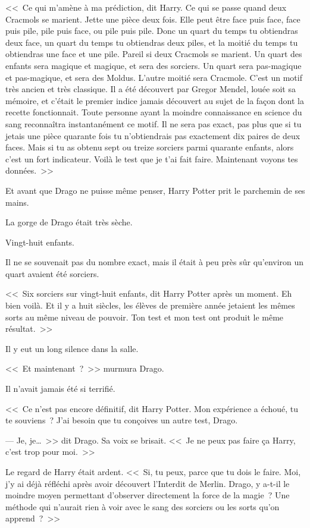 <<~Ce qui m'amène à ma prédiction, dit Harry. Ce qui se passe quand deux Cracmols se marient. Jette une pièce deux fois. Elle peut être face puis face, face puis pile, pile puis face, ou pile puis pile. Donc un quart du temps tu obtiendras deux face, un quart du temps tu obtiendras deux piles, et la moitié du temps tu obtiendras une face et une pile. Pareil si deux Cracmols se marient. Un quart des enfants sera magique et magique, et sera des sorciers. Un quart sera pas-magique et pas-magique, et sera des Moldus. L'autre moitié sera Cracmole. C'est un motif très ancien et très classique. Il a été découvert par Gregor Mendel, louée soit sa mémoire, et c'était le premier indice jamais découvert au sujet de la façon dont la recette fonctionnait. Toute personne ayant la moindre connaissance en science du sang reconnaîtra instantanément ce motif. Il ne sera pas exact, pas plus que si tu jetais une pièce quarante fois tu n'obtiendrais pas exactement dix paires de deux faces. Mais si tu as obtenu sept ou treize sorciers parmi quarante enfants, alors c'est un fort indicateur. Voilà le test que je t'ai fait faire. Maintenant voyons tes données.~>>

Et avant que Drago ne puisse même penser, Harry Potter prit le parchemin de ses mains.

La gorge de Drago était très sèche.

Vingt-huit enfants.

Il ne se souvenait pas du nombre exact, mais il était à peu près sûr qu'environ un quart avaient été sorciers.

<<~Six sorciers sur vingt-huit enfants, dit Harry Potter après un moment. Eh bien voilà. Et il y a huit siècles, les élèves de première année jetaient les mêmes sorts au même niveau de pouvoir. Ton test et mon test ont produit le même résultat.~>>

Il y eut un long silence dans la salle.

<<~Et maintenant~?~>> murmura Drago.

Il n'avait jamais été si terrifié.

<<~Ce n'est pas encore définitif, dit Harry Potter. Mon expérience a échoué, tu te souviens~? J'ai besoin que tu conçoives un autre test, Drago.

--- Je, je…~>> dit Drago. Sa voix se brisait. <<~Je ne peux pas faire ça Harry, c'est trop pour moi.~>>

Le regard de Harry était ardent. <<~Si, tu peux, parce que tu dois le faire. Moi, j'y ai déjà réfléchi après avoir découvert l'Interdit de Merlin. Drago, y a-t-il le moindre moyen permettant d'observer directement la force de la magie~? Une méthode qui n'aurait rien à voir avec le sang des sorciers ou les sorts qu'on apprend~?~>>

